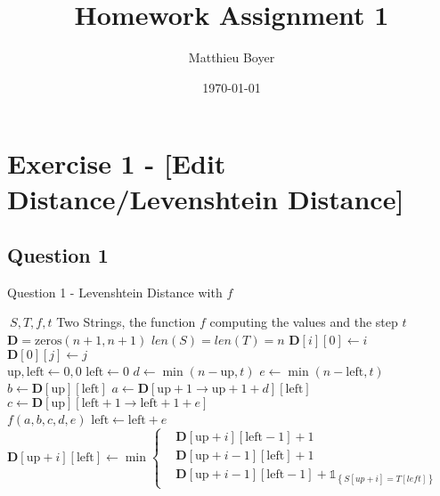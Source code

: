 \documentclass{cours}
\title{Homework Assignment 1}
\author{Matthieu Boyer}
\date{\today}
\begin{document}
\section{Exercise 1 - [Edit Distance/Levenshtein Distance]}
\subsection{Question 1}
\begin{algorithm}
    \caption{Question 1 - Levenshtein Distance with $f$}
    \begin{algorithmic}
        \Input $\ S, T, f, t$ \Comment Two Strings, the function $f$ computing the values and the step $t$
        \EndInput\\
        \State $\mathbf{D} = \text{zeros}(n + 1, n + 1)$ \Comment $len(S) = len(T) = n$
            \State $\mathbf{D}[i][0] \gets i$
        \EndFor\\
            \State $\mathbf{D}[0][j] \gets j$
        \EndFor\\
        \State $\text{up}, \text{left} \gets 0, 0$
            \State $\text{left} \gets 0$
                \State $d \gets \min(n-\text{up}, t)$
                \State $e \gets \min(n-\text{left}, t)$\\
                \State $b \gets \mathbf{D}[\text{up}][\text{left}]$
                \State $a \gets \mathbf{D}[\text{up} + 1 \rightarrow \text{up} + 1 + d][\text{left}]$
                \State $c \gets \mathbf{D}[\text{up}][\text{left} + 1 \rightarrow \text{left} + 1 + e]$\\
                \State $f(a, b, c, d, e)$ 
                \State $\text{left} \gets \text{left} + e$
                    \State $\mathbf{D}[\text{up} + i][\text{left}] \gets \min{\begin{cases}&\mathbf{D}[\text{up} + i][\text{left} - 1] + 1 \\ &\mathbf{D}[\text{up} + i - 1][\text{left}] + 1\\ &\mathbf{D}[\text{up} + i - 1][\text{left} - 1] + \mathds{1}_{\left\{S[up + i] = T[left]\right\}} \end{cases}}$ \\ 

\end{algorithmic}
\end{algorithm}
\end{document}
